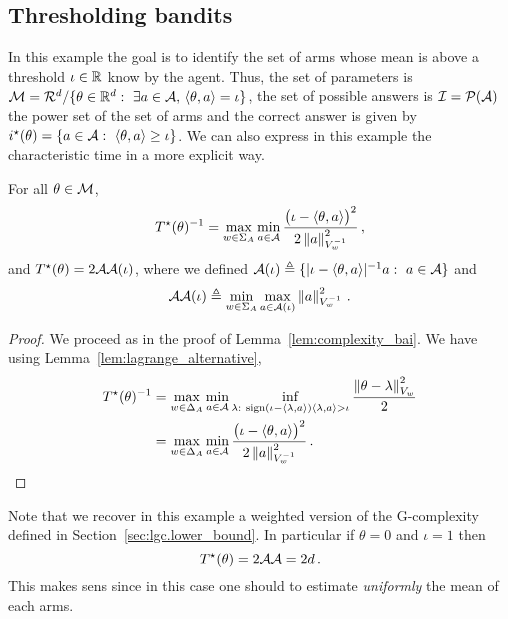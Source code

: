 \subsection{Thresholding bandits}
\label{app:threshold_bandits}
In this example the goal is to identify the set of arms whose mean is above a threshold $\iota\in \mathbb{R}$ know by the agent. Thus, the set of parameters is $\mathcal{M}=\mathcal{R}^d/\{\theta\in\mathbb{R}^d:\ \exists a\in \mathcal{A},\, \langle \theta,a\rangle = \iota\}$, the set of possible answers is $\mathcal{I} = \mathcal{P}(\mathcal{A})$ the power set of the set of arms and the correct answer is given by $i^\star(\theta)=\{a\in\mathcal{A}:\ \langle \theta,a\rangle \geq \iota\}$.
 We can also express in this example the characteristic time in a more explicit way.
\begin{lemma}
\label{lem:complexity_threshold_bandits}
For all $\theta\in \mathcal{M}$,
\[
T^{\star}(\theta)^{-1} =  \max_{w\in\Sigma_A} \min_{a\in\mathcal{A}} \frac{\big(\iota -\langle \theta,a\rangle\big)^2}{2 \left\lVert a\right\rVert_{V_w^{-1}}^2}\,,
\]
and $T^{\star}(\theta)= 2\mathcal{A}\mathcal{A}(\iota)$, where we defined $\mathcal{A}(\iota)\triangleq \{ |\iota- \langle\theta,a\rangle|^{-1} a:\ a\in\mathcal{A}\}$ and
\[
\mathcal{A}\mathcal{A}(\iota) \triangleq  \min_{w\in\Sigma_A} \max_{a\in\mathcal{A}(\iota)}\left\lVert a\right\rVert_{V_w^{-1}}^2\,.
\]
\end{lemma}
\begin{proof}
We proceed as in the proof of Lemma~\ref{lem:complexity_bai}. We have using Lemma~\ref{lem:lagrange_alternative},
\begin{align*}
  \Tstar(\theta)^{-1} &= \max_{w \in \Delta_A} \min_{a\in\cA} \inf_{\lambda:\ \text{sign}(\iota-\langle\lambda,a\rangle)\langle\lambda,a\rangle > \iota} \frac{\normm{\theta - \lambda}_{V_w}^2}{2}\\
  &= \max_{w \in \Delta_A} \min_{a\in\cA}  \frac{\big(\iota -\langle \theta,a\rangle\big)^2}{2 \normm{a}_{V_w^{-1}}^2}\,.
\end{align*}
\end{proof}
Note that we recover in this example a weighted version of the G-complexity defined in Section~\ref{sec:lgc.lower_bound}. In particular if $\theta=0$ and $\iota=1$ then
\[
T^{\star}(\theta) =2\mathcal{A}\mathcal{A} = 2d\,.
\]
This makes sens since in this case one should to estimate \emph{uniformly} the mean of each arms.


